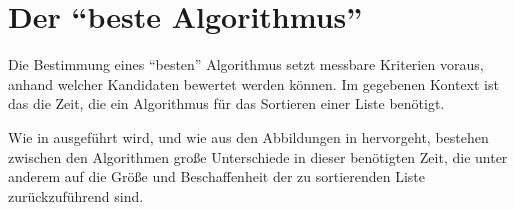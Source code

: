 
\section{Der \enquote{beste Algorithmus}}
\label{sec:best-algo}

Die Bestimmung eines \enquote{besten} Algorithmus setzt messbare Kriterien voraus, anhand welcher Kandidaten bewertet werden können. Im gegebenen Kontext ist das die Zeit, die ein Algorithmus für das Sortieren einer Liste benötigt.

Wie in  ausgeführt wird, und wie aus den Abbildungen in  hervorgeht, bestehen zwischen den Algorithmen große Unterschiede in dieser benötigten Zeit, die unter anderem auf die Größe und Beschaffenheit der zu sortierenden Liste zurückzuführend sind.

